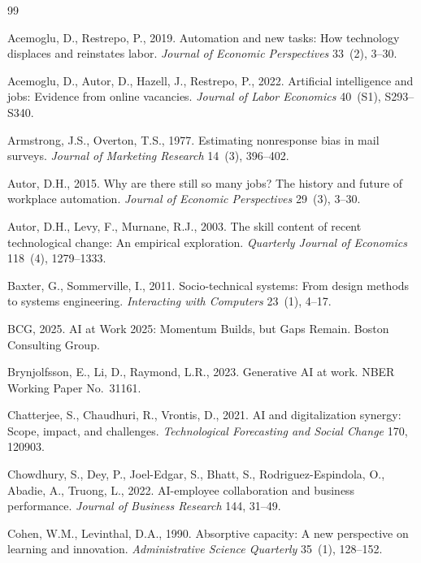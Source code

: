 \documentclass[12pt, a4paper]{article}
\begin{document}
\begin{thebibliography}{99}

Acemoglu, D., Restrepo, P., 2019. Automation and new tasks: How technology displaces and reinstates labor. \textit{Journal of Economic Perspectives} 33~(2), 3--30.

Acemoglu, D., Autor, D., Hazell, J., Restrepo, P., 2022. Artificial intelligence and jobs: Evidence from online vacancies. \textit{Journal of Labor Economics} 40~(S1), S293--S340.

Armstrong, J.S., Overton, T.S., 1977. Estimating nonresponse bias in mail surveys. \textit{Journal of Marketing Research} 14~(3), 396--402.

Autor, D.H., 2015. Why are there still so many jobs? The history and future of workplace automation. \textit{Journal of Economic Perspectives} 29~(3), 3--30.

Autor, D.H., Levy, F., Murnane, R.J., 2003. The skill content of recent technological change: An empirical exploration. \textit{Quarterly Journal of Economics} 118~(4), 1279--1333.

Baxter, G., Sommerville, I., 2011. Socio-technical systems: From design methods to systems engineering. \textit{Interacting with Computers} 23~(1), 4--17.

BCG, 2025. AI at Work 2025: Momentum Builds, but Gaps Remain. Boston Consulting Group.

Brynjolfsson, E., Li, D., Raymond, L.R., 2023. Generative AI at work. NBER Working Paper No.\ 31161.

Chatterjee, S., Chaudhuri, R., Vrontis, D., 2021. AI and digitalization synergy: Scope, impact, and challenges. \textit{Technological Forecasting and Social Change} 170, 120903.

Chowdhury, S., Dey, P., Joel-Edgar, S., Bhatt, S., Rodriguez-Espindola, O., Abadie, A., Truong, L., 2022. AI-employee collaboration and business performance. \textit{Journal of Business Research} 144, 31--49.

Cohen, W.M., Levinthal, D.A., 1990. Absorptive capacity: A new perspective on learning and innovation. \textit{Administrative Science Quarterly} 35~(1), 128--152.


\end{thebibliography}
\end{document}
